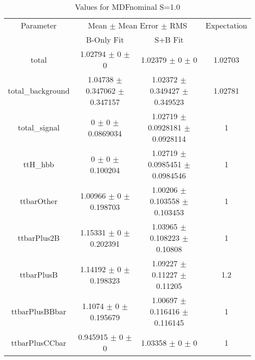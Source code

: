 \begin{table}
\centering
\caption{Values for MDFnominal S=1.0}
\begin{tabular}{cccc}
\toprule
Parameter & \multicolumn{2}{c}{Mean $\pm$ Mean Error $\pm$ RMS} & Expectation\\
 & B-Only Fit & S+B Fit & \\
\midrule
total & \num{1.02794} $\pm$ \num{0} $\pm$ \num{0} & \num{1.02379} $\pm$ \num{0} $\pm$ \num{0} & \num{1.02703}\\
total\_background & \num{1.04738} $\pm$ \num{0.347062} $\pm$ \num{0.347157} & \num{1.02372} $\pm$ \num{0.349427} $\pm$ \num{0.349523} & \num{1.02781}\\
total\_signal & \num{0} $\pm$ \num{0} $\pm$ \num{0.0869034} & \num{1.02719} $\pm$ \num{0.0928181} $\pm$ \num{0.0928114} & \num{1}\\
ttH\_hbb & \num{0} $\pm$ \num{0} $\pm$ \num{0.100204} & \num{1.02719} $\pm$ \num{0.0985451} $\pm$ \num{0.0984546} & \num{1}\\
ttbarOther & \num{1.00966} $\pm$ \num{0} $\pm$ \num{0.198703} & \num{1.00206} $\pm$ \num{0.103558} $\pm$ \num{0.103453} & \num{1}\\
ttbarPlus2B & \num{1.15331} $\pm$ \num{0} $\pm$ \num{0.202391} & \num{1.03965} $\pm$ \num{0.108223} $\pm$ \num{0.10808} & \num{1}\\
ttbarPlusB & \num{1.14192} $\pm$ \num{0} $\pm$ \num{0.198323} & \num{1.09227} $\pm$ \num{0.11227} $\pm$ \num{0.11205} & \num{1.2}\\
ttbarPlusBBbar & \num{1.1074} $\pm$ \num{0} $\pm$ \num{0.195679} & \num{1.00697} $\pm$ \num{0.116416} $\pm$ \num{0.116145} & \num{1}\\
ttbarPlusCCbar & \num{0.945915} $\pm$ \num{0} $\pm$ \num{0} & \num{1.03358} $\pm$ \num{0} $\pm$ \num{0} & \num{1}\\
\bottomrule
\end{tabular}
\end{table}